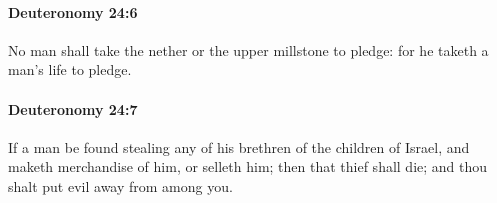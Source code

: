 		\paragraph{Deuteronomy 24:6} %
			\label{DEUTERONOMY-24-6}

			No man shall take the nether or the upper millstone to pledge: for he taketh a man's life to pledge.


		\paragraph{Deuteronomy 24:7} %
			\label{DEUTERONOMY-24-7}

			If a man be found stealing any of his brethren of the children of Israel, and maketh merchandise of him, or selleth him; then that thief shall die; and thou shalt put evil away from among you.


